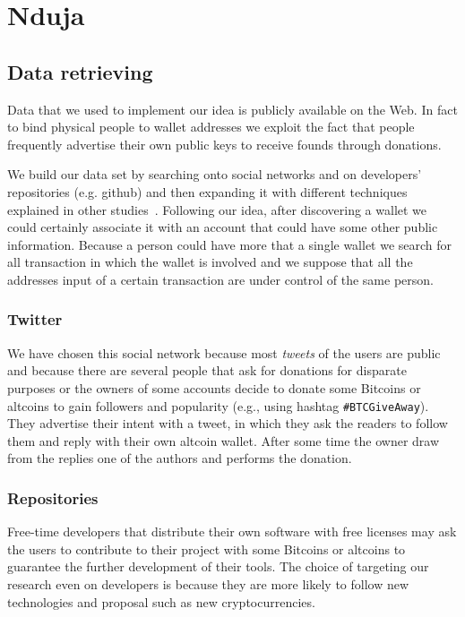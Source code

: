 \section{Nduja}

\subsection{Data retrieving}
Data that we used to implement our idea is publicly available on the Web. In
fact to bind physical people to wallet addresses we exploit the fact that
people frequently advertise their own public keys to receive founds
through donations.

We build our data set by searching onto social networks and on developers'
repositories (e.g. github) and then expanding it with different techniques
explained in other studies~\cite{fistful}. Following our idea, after discovering
a wallet we could certainly associate it with an account that could have some
other public information. Because a person could have more that a single wallet
we search for all transaction in which the wallet is involved and we suppose
that all the addresses input of a certain transaction are under control of the
same person.

\subsubsection*{Twitter}
We have chosen this social network because most \textit{tweets} of the users are
public and because there are several people that ask for donations 
for disparate purposes or the owners of some accounts decide to donate some
Bitcoins or altcoins to gain followers and popularity (e.g., using hashtag
\texttt{\#BTCGiveAway}). They advertise their intent with a tweet, in which
they ask the readers to follow them and reply with their own altcoin wallet.
After some time the owner draw from the replies one of the authors and performs
the donation.

\subsubsection*{Repositories}
Free-time developers that distribute their own software with free licenses may
ask the users to contribute to their project with some Bitcoins or altcoins to
guarantee the further development of their tools. The choice of targeting our
research even on developers is because they are more likely to follow new
technologies and proposal such as new cryptocurrencies.

